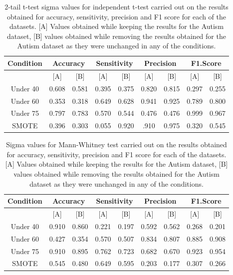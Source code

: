 \begin{table}[!htbp]
\centering
\begin{tabular}{*9c}
  \hline
  \rowcolor{LightCyan}
Condition &\multicolumn{2}{c}{Accuracy} &\multicolumn{2}{c}{Sensitivity} &\multicolumn{2}{c}{Precision}&\multicolumn{2}{c}{F1.Score}\\
  \hline
           & [A] & [B] & [A] & [B] & [A] & [B] & [A] & [B] \\
Under 40  &0.608& 0.581& 0.395 & 0.375 & 0.820 & 0.815 & 0.297 & 0.255 \\ 
  Under 60 &0.353& 0.318& 0.649 & 0.628 & 0.941 & 0.925 & 0.789 & 0.800 \\ 
  Under 75 &0.797&0.783 & 0.570 & 0.544 & 0.476 & 0.476 & 0.999 & 0.967 \\ 
  SMOTE &  0.396 & 0.303& 0.055 & 0.920  & .910 &0.975 & 0.320 & 0.545 \\
   \hline
\end{tabular}
\caption{2-tail t-test sigma values for independent t-test carried out on the results obtained for accuracy, sensitivity, precision and F1 score for each of the datasets. [A] Values obtained while keeping the results for the Autism dataset, [B] values obtained while removing the results obtained for the Autism dataset as they were unchanged in any of the conditions.}
\end{table}


\begin{table}[!htbp]
\centering
\begin{tabular}{*9c}
  \hline
  \rowcolor{LightCyan}
Condition &\multicolumn{2}{c}{Accuracy} &\multicolumn{2}{c}{Sensitivity} &\multicolumn{2}{c}{Precision}&\multicolumn{2}{c}{F1.Score}\\
  \hline
           & [A] & [B] & [A] & [B] & [A] & [B] & [A] & [B] \\
Under 40  &0.910& 0.860& 0.221 & 0.197 & 0.592 & 0.562 & 0.268 & 0.201 \\ 
  Under 60 &0.427& 0.354& 0.570 & 0.507 & 0.834 & 0.807 & 0.885 & 0.908 \\ 
  Under 75 &0.910&0.895 & 0.762 & 0.723 & 0.682 & 0.670 & 0.923 & 0.954 \\ 
  SMOTE &  0.545 & 0.480& 0.649 & 0.595  & 0.203 &0.177 & 0.307 & 0.266 \\
   \hline
\end{tabular}
\caption{Sigma values for Mann-Whitney test carried out on the results obtained for accuracy, sensitivity, precision and F1 score for each of the datasets. [A] Values obtained while keeping the results for the Autism dataset, [B] values obtained while removing the results obtained for the Autism dataset as they were unchanged in any of the conditions.}
\end{table}
 

